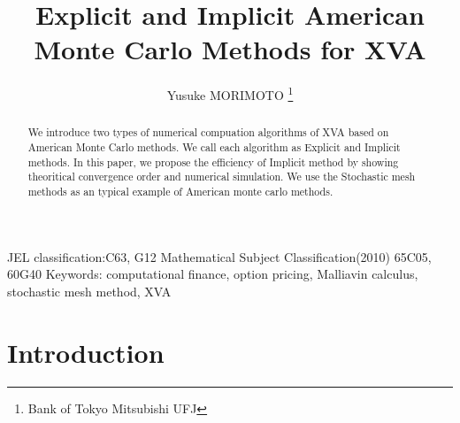 \documentclass[12pt]{article}
\begin{document}
\title{Explicit and Implicit American Monte Carlo Methods for XVA}

\author{
Yusuke MORIMOTO
\thanks{
Bank of Tokyo Mitsubishi UFJ }
}
\date{}

\maketitle
\begin{abstract}
We introduce two types of numerical compuation algorithms of XVA based on American Monte Carlo methods. We call each algorithm as Explicit and Implicit methods.
In this paper, we propose the efficiency
of Implicit method by showing theoritical convergence order and numerical simulation. 
We use the Stochastic mesh methods as an typical example of American monte carlo methods.
\end{abstract}

JEL classification:C63, G12
Mathematical Subject Classification(2010)   65C05,  60G40
Keywords:  computational finance, option pricing, Malliavin calculus,
stochastic mesh method, XVA

\section{Introduction}
\end{document}
